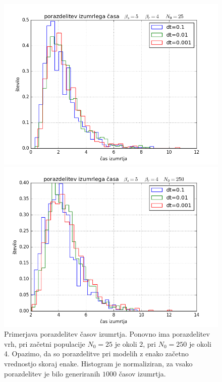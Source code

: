 \documentclass[slovene,11pt,a4paper]{article}
\numberwithin{equation}{section} %
\numberwithin{figure}{section} %
\numberwithin{table}{section} %
\begin{document}
\begin{figure}[h]
\centering
\begin{minipage}{0.5\textwidth}
\centering
\includegraphics[scale=0.45]{slike/porazdelitev_umrlirojstvocas_25.png}
\end{minipage}\hfill
\begin{minipage}{0.5\textwidth}
\centering
\includegraphics[scale=0.45]{slike/porazdelitev_umrlirojstvocas_250.png}
\end{minipage}
\caption{Primerjava porazdelitev časov izumrtja. Ponovno ima porazdelitev vrh, pri začetni populacije $N_0=25$ je okoli $2$, pri $N_0=250$ je okoli 4. Opazimo, da so porazdelitve pri modelih z enako začetno vrednostjo skoraj enake. Histogram je normaliziran, za vsako porazdelitev je bilo generiranih $1000$ časov izumrtja.}
\end{figure}
\end{document}
